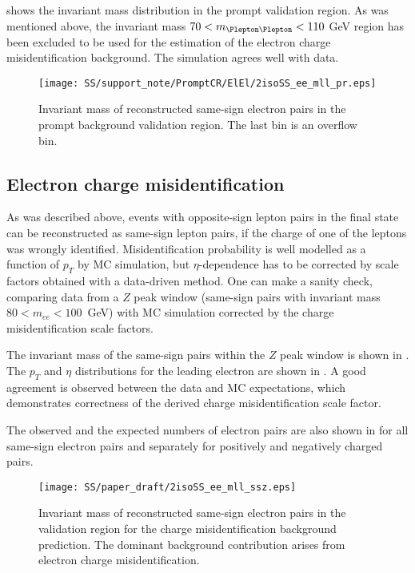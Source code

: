  shows the invariant mass distribution in the prompt validation region. As was mentioned above, 
the invariant mass $70 < m_{\Plepton\Plepton}< 110$ GeV region has been excluded
to be used for the estimation of the electron charge misidentification background.
The simulation agrees well with data.

\begin{figure}[h]
\begin{center}
\texttt{[image: SS/support\_note/PromptCR/ElEl/2isoSS\_ee\_mll\_pr.eps]}
\caption{Invariant mass of reconstructed same-sign electron pairs in the prompt background validation region. The last bin is an overflow bin.}
\label{fig:prompt_CR}
\end{center}
\end{figure} 


\subsection{Electron charge misidentification}

As was described above, events with opposite-sign lepton pairs in the final state can be reconstructed as same-sign lepton pairs, 
if the charge of one of the leptons was wrongly identified.
Misidentification probability is well modelled as a function of $p_T$ by MC simulation, 
but $\eta$-dependence has to be corrected by scale factors obtained with a data-driven method.
One can make a sanity check, comparing data from a $Z$ peak window (same-sign pairs with invariant mass $80 < m_{ee} < 100$~GeV)
with MC simulation corrected by the charge misidentification scale factors.

The invariant mass of the same-sign pairs within the $Z$ peak window is shown in . 
The $p_T$ and $\eta$ distributions for the leading electron are shown in .
A good agreement is observed between the data and MC expectations, which demonstrates correctness of the derived charge misidentification scale factor.

The observed and the expected numbers of electron pairs are also shown in  for all same-sign electron pairs and separately for positively and negatively charged pairs.

\begin{figure}[h]
\begin{center}
\texttt{[image: SS/paper\_draft/2isoSS\_ee\_mll\_ssz.eps]}
\caption{Invariant mass of reconstructed same-sign electron pairs in the validation region for the charge misidentification background prediction.
The dominant background contribution arises from electron charge misidentification.
}
\label{fig:charge_flip_CR_inv_mass}
\end{center}
\end{figure} 

